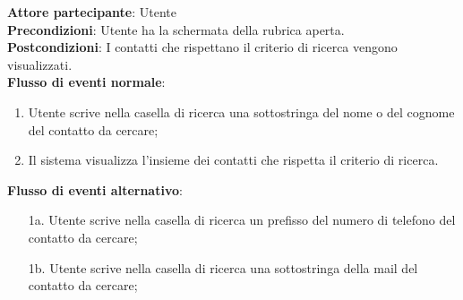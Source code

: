 \begin{tcolorbox}[colback=white,colframe=black!80!white,title=\textbf{C3 - Cercare contatto}]
	\textbf{Attore partecipante}: Utente
	\\\textbf{Precondizioni}: Utente ha la schermata della rubrica aperta.
	\\\textbf{Postcondizioni}: I contatti che rispettano il criterio di ricerca vengono visualizzati.
	\\\textbf{Flusso di eventi normale}:
	\begin{enumerate}[noitemsep, topsep=0pt]
		\item Utente scrive nella casella di ricerca una sottostringa del nome o del cognome del contatto da cercare;
		\item Il sistema visualizza l’insieme dei contatti che rispetta il criterio di ricerca.		
	\end{enumerate}
	\textbf{Flusso di eventi alternativo}:
	\begin{itemize}[noitemsep, topsep=0pt]
		\item[1a.] Utente scrive nella casella di ricerca un prefisso del numero di telefono del contatto da cercare;
		\item[1b.] Utente scrive nella casella di ricerca una sottostringa della mail del contatto da cercare;
	\end{itemize}
\end{tcolorbox}

